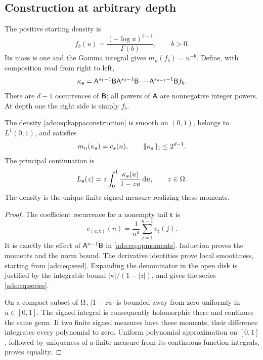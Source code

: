 \subsection{Construction at arbitrary depth}
The positive starting density is
\begin{equation}\label{ado:eq:seed}
 f_b(u)=\frac{(-\log u)^{b-1}}{\Gamma(b)},\qquad b>0.
\end{equation}
Its mass is one and the Gamma integral gives $m_n(f_b)=n^{-b}$.
Define, with composition read from right to left,
\begin{equation}\label{ado:eq:kappaconstruction}
 \kappa_{\boldsymbol{s}}
 =\mathsf A^{s_1-1}\mathsf B\mathsf A^{s_2-1}\mathsf B\cdots
       \mathsf A^{s_{d-1}-1}\mathsf B f_b.
\end{equation}
There are $d-1$ occurrences of $\mathsf B$; all powers of $\mathsf A$ are
nonnegative integer powers. At depth one the right side is simply $f_b$.

\begin{proposition}
\label{ado:prop:realization}
The density \eqref{ado:eq:kappaconstruction} is smooth on $(0,1)$,
belongs to $L^1(0,1)$, and satisfies
\begin{equation}\label{ado:eq:moments}
 m_n(\kappa_{\boldsymbol{s}})=c_{\boldsymbol{s}}(n),\qquad
 \lVert\kappa_{\boldsymbol{s}}\rVert_1\le2^{d-1}.
\end{equation}
The principal continuation is
\begin{equation}\label{ado:eq:signedtransform}
 L_{\boldsymbol{s}}(z)=z\int_0^1\frac{\kappa_{\boldsymbol{s}}(u)}{1-zu}\,\mathrm d u,
 \qquad z\in\Omega.
\end{equation}
The density is the unique finite signed measure realizing these moments.
\end{proposition}
\begin{proof}
The coefficient recurrence for a nonempty tail $\boldsymbol{t}$ is
\[
 c_{(a,\boldsymbol{t})}(n)
 =\frac1{n^a}\sum_{j=1}^{n-1}c_{\boldsymbol{t}}(j).
\]
It is exactly the effect of $\mathsf A^{a-1}\mathsf B$ in
\eqref{ado:eq:opmoments}. Induction proves the moments and the norm
bound. The derivative identities prove local smoothness, starting from
\eqref{ado:eq:seed}. Expanding the denominator in the open disk is
justified by the integrable bound $|\kappa|/(1-|z|)$, and gives the
series \eqref{ado:eq:series}.

On a compact subset of $\Omega$, $|1-zu|$ is bounded away from zero
uniformly in $u\in[0,1]$. The signed integral is consequently holomorphic
there and continues the same germ. If two finite signed measures have
these moments, their difference integrates every polynomial to zero.
Uniform polynomial approximation on $[0,1]$, followed by uniqueness of
a finite measure from its continuous-function integrals, proves equality.
\end{proof}

